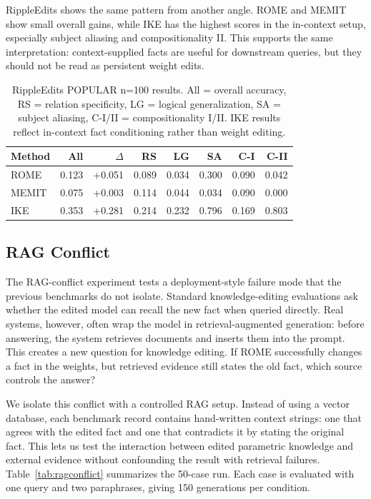 \documentclass[11pt]{article}
\begin{document}
RippleEdits shows the same pattern from another angle. ROME and MEMIT show small overall gains, while IKE has the highest scores in the in-context setup, especially subject aliasing and compositionality II. This supports the same interpretation: context-supplied facts are useful for downstream queries, but they should not be read as persistent weight edits.

\begin{table}[!htbp]
\centering
\scriptsize
\setlength{\tabcolsep}{2.2pt}
\begin{tabular*}{\columnwidth}{@{\extracolsep{\fill}}lrrrrrrr@{}}
\toprule
Method & All & $\Delta$ & RS & LG & SA & C-I & C-II \\
\midrule
ROME & 0.123 & +0.051 & 0.089 & 0.034 & 0.300 & 0.090 & 0.042 \\
MEMIT & 0.075 & +0.003 & 0.114 & 0.044 & 0.034 & 0.090 & 0.000 \\
IKE & 0.353 & +0.281 & 0.214 & 0.232 & 0.796 & 0.169 & 0.803 \\
\bottomrule
\end{tabular*}
\caption{RippleEdits POPULAR n=100 results. All = overall accuracy, RS = relation specificity, LG = logical generalization, SA = subject aliasing, C-I/II = compositionality I/II. IKE results reflect in-context fact conditioning rather than weight editing.}
\label{tab:ripple}
\end{table}

\subsection{RAG Conflict}

The RAG-conflict experiment tests a deployment-style failure mode that the previous benchmarks do not isolate. Standard knowledge-editing evaluations ask whether the edited model can recall the new fact when queried directly. Real systems, however, often wrap the model in retrieval-augmented generation: before answering, the system retrieves documents and inserts them into the prompt. This creates a new question for knowledge editing. If ROME successfully changes a fact in the weights, but retrieved evidence still states the old fact, which source controls the answer?

We isolate this conflict with a controlled RAG setup. Instead of using a vector database, each benchmark record contains hand-written context strings: one that agrees with the edited fact and one that contradicts it by stating the original fact. This lets us test the interaction between edited parametric knowledge and external evidence without confounding the result with retrieval failures. Table~\ref{tab:ragconflict} summarizes the 50-case run. Each case is evaluated with one query and two paraphrases, giving 150 generations per condition.
\end{document}
